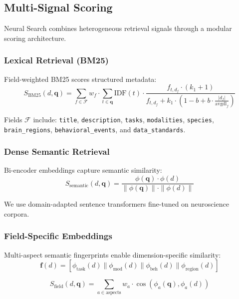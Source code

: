 \documentclass{article}
\theoremstyle{definition}
\newcommand{\query}{\mathbf{q}}
\newcommand{\embed}{\phi}
\newcommand{\fingerprint}{\mathbf{f}}
\begin{document}
\subsection{Multi-Signal Scoring}

Neural Search combines heterogeneous retrieval signals through a modular scoring architecture.

\subsubsection{Lexical Retrieval (BM25)}

Field-weighted BM25 \citep{robertson2004simple} scores structured metadata:
\begin{equation}
S_{\text{BM25}}(d, \query) = \sum_{f \in \mathcal{F}} w_f \cdot \sum_{t \in \query} \text{IDF}(t) \cdot \frac{f_{t,d_f} \cdot (k_1 + 1)}{f_{t,d_f} + k_1 \cdot (1 - b + b \cdot \frac{|d_f|}{\text{avgdl}_f})}
\end{equation}

Fields $\mathcal{F}$ include: \texttt{title}, \texttt{description}, \texttt{tasks}, \texttt{modalities}, \texttt{species}, \texttt{brain\_regions}, \texttt{behavioral\_events}, and \texttt{data\_standards}.

\subsubsection{Dense Semantic Retrieval}

Bi-encoder embeddings capture semantic similarity:
\begin{equation}
S_{\text{semantic}}(d, \query) = \frac{\embed(\query) \cdot \embed(d)}{\|\embed(\query)\| \cdot \|\embed(d)\|}
\end{equation}

We use domain-adapted sentence transformers \citep{reimers2019sentence} fine-tuned on neuroscience corpora.

\subsubsection{Field-Specific Embeddings}

Multi-aspect semantic fingerprints enable dimension-specific similarity:
\begin{equation}
\fingerprint(d) = [\embed_{\text{task}}(d) \| \embed_{\text{mod}}(d) \| \embed_{\text{beh}}(d) \| \embed_{\text{region}}(d)]
\end{equation}

\begin{equation}
S_{\text{field}}(d, \query) = \sum_{a \in \text{aspects}} w_a \cdot \cos(\embed_a(\query), \embed_a(d))
\end{equation}
\end{document}
